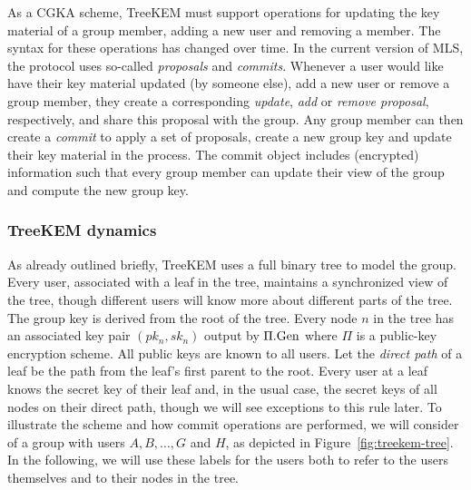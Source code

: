 As a CGKA scheme, TreeKEM must support operations for updating the key material of a group member, adding a new user and removing a member. The syntax for these operations has changed over time. In the current version of MLS, the protocol uses so-called \emph{proposals} and \emph{commits}. Whenever a user would like have their key material updated (by someone else), add a new user or remove a group member, they create a corresponding \emph{update}, \emph{add} or \emph{remove proposal}, respectively, and share this proposal with the group. Any group member can then create a \emph{commit} to apply a set of proposals, create a new group key and update their key material in the process. The commit object includes (encrypted) information such that every group member can update their view of the group and compute the new group key.

\subsubsection{TreeKEM dynamics}

As already outlined briefly, TreeKEM uses a full binary tree to model the group. Every user, associated with a leaf in the tree, maintains a synchronized view of the tree, though different users will know more about different parts of the tree. The group key is derived from the root of the tree. Every node $n$ in the tree has an associated key pair $(pk_n, sk_n)$ output by $\Pi.\mathrm{Gen}$ where $\Pi$ is a public-key encryption scheme. All public keys are known to all users. Let the \emph{direct path} of a leaf be the path from the leaf's first parent to the root. Every user at a leaf knows the secret key of their leaf and, in the usual case, the secret keys of all nodes on their direct path, though we will see exceptions to this rule later. To illustrate the scheme and how commit operations are performed, we will consider of a group with users $A, B, \ldots, G$ and $H$, as depicted in Figure~\ref{fig:treekem-tree}. In the following, we will use these labels for the users both to refer to the users themselves and to their nodes in the tree.

